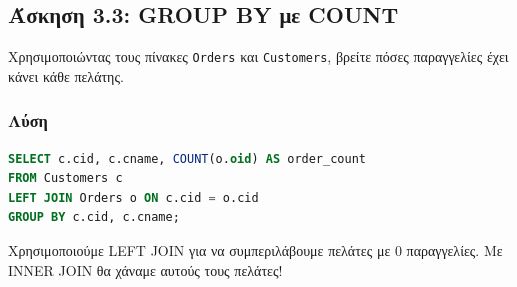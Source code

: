 \begin{center}
\end{center}

\subsection{Άσκηση 3.3: GROUP BY με COUNT}

\begin{formulabox}[Εκφώνηση]
Χρησιμοποιώντας τους πίνακες \texttt{Orders} και \texttt{Customers}, βρείτε πόσες
παραγγελίες έχει κάνει κάθε πελάτης.
\end{formulabox}

\subsubsection*{Λύση}

\begin{lstlisting}[language=SQL]
SELECT c.cid, c.cname, COUNT(o.oid) AS order_count
FROM Customers c
LEFT JOIN Orders o ON c.cid = o.cid
GROUP BY c.cid, c.cname;
\end{lstlisting}

\begin{warningbox}
Χρησιμοποιούμε LEFT JOIN για να συμπεριλάβουμε πελάτες με 0 παραγγελίες.
Με INNER JOIN θα χάναμε αυτούς τους πελάτες!
\end{warningbox}

